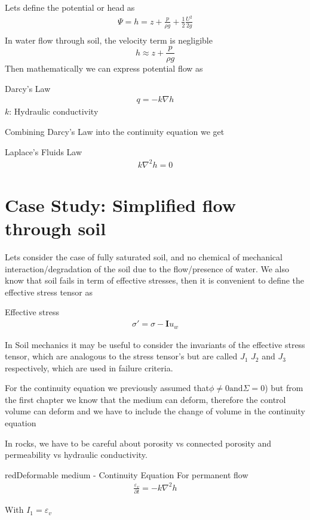 \documentclass[a4paper, 11pt,article,oneside]{memoir}%
\begin{document}
Lets define the potential or head as
\begin{gather*}
\Psi=h=z+\frac{p}{\rho g}+\frac{1}{2}\frac{U^2}{2g}\\
\end{gather*}
In water flow through soil, the velocity term is negligible
$$ h\approx z+\frac{p}{\rho g}$$
Then mathematically we can express potential flow as 
\begin{eqbox2}{}{Darcy's Law}
\begin{gather*}
q=-k\nabla h
\end{gather*}
$k$: Hydraulic conductivity 
\end{eqbox2} 
Combining Darcy's Law into the continuity equation we get 
\begin{eqbox2}{}{Laplace's Fluids Law}
\begin{gather*}
k\nabla^2h=0
\end{gather*}
\end{eqbox2}

\section{Case Study: Simplified flow through soil}
Lets consider the case of fully saturated soil, and no chemical of mechanical interaction/degradation of the soil due to the flow/presence of water. We also know that soil fails in term of effective stresses, then it is convenient to define the effective stress tensor as
\begin{eqbox2}{}{Effective stress} 
\begin{align*}
\sigma'=\sigma-\boldsymbol{I}u_w
\end{align*}
\end{eqbox2}
In Soil mechanics it may be  useful to consider the invariants of the effective stress tensor, which are analogous to the stress tensor's but are called $J_1$ $J_2$ and $J_3$ respectively, which are used in failure criteria\cite{ICE2614}.

For the continuity equation we previously assumed that$\phi\neq0 \text{and} \Sigma=0$) but from the first chapter we know that the medium can deform, therefore the control volume can deform and we have to include the change of volume in the continuity equation
\begin{note}
In rocks, we have to be careful about porosity vs connected porosity and permeability vs hydraulic conductivity.\end{note} 
\begin{eqbox2}{red}{Deformable medium - Continuity Equation}
For permanent flow
\begin{align*}
\frac{\varepsilon_v}{\partial t}=-k \nabla^2 h
\end{align*}
\end{eqbox2}
With 
$I_1=\varepsilon_v$
\end{document}

